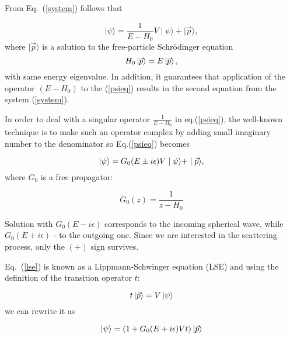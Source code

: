     From Eq.~(\ref{system}) follows that

    \begin{equation}
        \mid \psi \rangle = \frac{1}{E - H_0}V \mid \psi \rangle +  \mid \vec{p} \rangle,
        \label{psieq}
    \end{equation}
    where $\mid \vec{p} \rangle$ is a solution to the
    free-particle Schr\"{o}dinger equation
    \begin{equation}
        H_0 \ket{\vec{p}} =  E  \ket{\vec{p}},
    \end{equation}
    with same energy eigenvalue\cite{Sakurai}.
    In addition, it guarantees that
     application of the operator $(E -H_0)$ to the 
    (\ref{psieq}) results in the second equation from the system (\ref{system}).


    In order to deal with a singular operator $\frac{1}{E - H_0}$ in eq.(\ref{psieq}), the well-known
    technique is to make such an operator complex by adding small imaginary number to the denominator
    so Eq.(\ref{psieq}) becomes

    \begin{equation}
        \ket{\psi} = G_0(E \pm i\epsilon)V \mid \psi \rangle +  \mid \vec{p} \rangle,
        \label{lse}
    \end{equation}
    where $G_0$ is a free propagator:

    \begin{equation}
        G_0(z) = \frac{1}{z - H_0}
        \label{g0}
    \end{equation}

    Solution with $G_0(E - i\epsilon)$ corresponds to the incoming spherical wave,
    while $G_0(E + i\epsilon)$ - to the outgoing one. Since we are interested in the scattering
    process, only the $(+)$ sign survives.
    
    Eq.~(\ref{lse}) is known as a Lippmann-Schwinger equation (LSE) and using
    the definition of the transition operator $t$:

    \begin{equation}
        t \ket{\vec{p}} = V \ket{\psi}
        \label{t-op}
    \end{equation}
    we can rewrite it as 

    \begin{equation}
        \ket{\psi} = (1 + G_0(E + i\epsilon)V t)  \ket {\vec{p}}
        \label{psi_toper}
    \end{equation}

